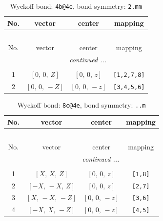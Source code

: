 \documentclass[fleqn,8pt]{jsarticle}
\begin{document}
\renewcommand{\arraystretch}{1.2}
\begin{longtable}{cccc}
\caption{Wyckoff bond: {\tt 4b@4e}, bond symmetry: {\tt 2.mm}}
 \\
 \hline \hline
No. & vector & center & mapping \\ \hline \endfirsthead

\multicolumn{3}{l}{\tablename\ \thetable{}} \\
 \hline \hline
No. & vector & center & mapping \\ \hline \endhead

 \hline \hline
\multicolumn{3}{r}{\footnotesize\it continued ...} \\ \endfoot

 \hline \hline
\multicolumn{3}{r}{} \\ \endlastfoot

1 & $\left[ 0,\, 0,\, Z \right]$ & $\left[ 0,\, 0,\, z \right]$ & {\tt [1,2,7,8]} \\ \hline
2 & $\left[ 0,\, 0,\, - Z \right]$ & $\left[ 0,\, 0,\, - z \right]$ & {\tt [3,4,5,6]} \\
\end{longtable}
\renewcommand{\arraystretch}{1.2}
\begin{longtable}{cccc}
\caption{Wyckoff bond: {\tt 8c@4e}, bond symmetry: {\tt ..m}}
 \\
 \hline \hline
No. & vector & center & mapping \\ \hline \endfirsthead

\multicolumn{3}{l}{\tablename\ \thetable{}} \\
 \hline \hline
No. & vector & center & mapping \\ \hline \endhead

 \hline \hline
\multicolumn{3}{r}{\footnotesize\it continued ...} \\ \endfoot

 \hline \hline
\multicolumn{3}{r}{} \\ \endlastfoot

1 & $\left[ X,\, X,\, Z \right]$ & $\left[ 0,\, 0,\, z \right]$ & {\tt [1,8]} \\ \hline
2 & $\left[ - X,\, - X,\, Z \right]$ & $\left[ 0,\, 0,\, z \right]$ & {\tt [2,7]} \\ \hline
3 & $\left[ X,\, - X,\, - Z \right]$ & $\left[ 0,\, 0,\, - z \right]$ & {\tt [3,6]} \\ \hline
4 & $\left[ - X,\, X,\, - Z \right]$ & $\left[ 0,\, 0,\, - z \right]$ & {\tt [4,5]} \\
\end{longtable}
\end{document}
